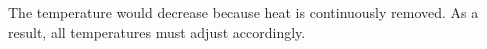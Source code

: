 The temperature would decrease because heat is continuously removed. As a result, all temperatures must adjust accordingly.